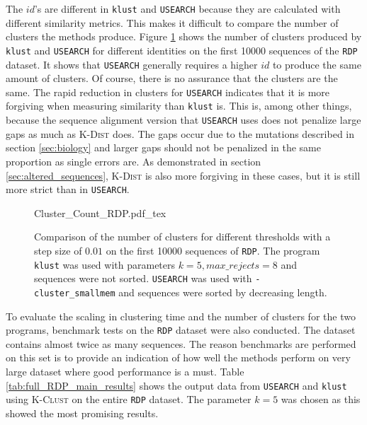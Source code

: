 The $id$'s are different in \texttt{klust} and \texttt{USEARCH} because they
are calculated with different similarity metrics. This makes it difficult to
compare the number of clusters the methods produce. Figure
\ref{fig:id_comparison} shows the number of clusters produced by \texttt{klust}
and \texttt{USEARCH} for different identities on the first \num{10000}
sequences of the \texttt{RDP} dataset. It shows that \texttt{USEARCH} generally
requires a higher $id$ to produce the same amount of clusters. Of course, there
is no assurance that the clusters are the same. The rapid reduction in clusters
for \texttt{USEARCH} indicates that it is more forgiving when measuring
similarity than \texttt{klust} is. This is, among other things, because the
sequence alignment version that \texttt{USEARCH} uses does not penalize large
gaps as much as \textsc{K-Dist} does. The gaps occur due to the mutations
described in section \ref{sec:biology} and larger gaps should not be penalized
in the same proportion as single errors are. As demonstrated in section
\ref{sec:altered_sequences}, \textsc{K-Dist} is also more forgiving in these
cases, but it is still more strict than in \texttt{USEARCH}.

\begin{figure}[H]
  \centering
  \def\svgwidth{\columnwidth}
  {Cluster_Count_RDP.pdf_tex}
  \caption{Comparison of the number of clusters for different thresholds with a
    step size of $0.01$ on the first \num{10000} sequences of \texttt{RDP}.
    The program \texttt{klust} was used with parameters $k=5, max\_rejects=8$
    and sequences were not sorted. \texttt{USEARCH} was used with
    \texttt{-cluster\_smallmem} and sequences were sorted by decreasing length.}
  \label{fig:id_comparison}
\end{figure}

To evaluate the scaling in clustering time and the number of clusters for the
two programs, benchmark tests on the \texttt{RDP} dataset were also conducted.
The dataset contains almost twice as many sequences. The reason benchmarks are
performed on this set is to provide an indication of how well the methods
perform on very large dataset where good performance is a must. Table
\ref{tab:full_RDP_main_results} shows the output data from \texttt{USEARCH} and
\texttt{klust} using \textsc{K-Clust} on the entire \texttt{RDP} dataset.  The
parameter $k=5$ was chosen as this showed the most promising results.

